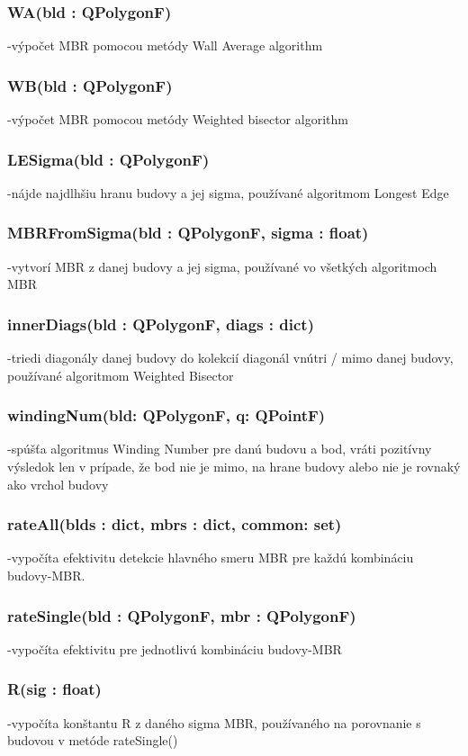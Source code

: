 \documentclass[12pt]{article}
\begin{document}
\subsubsection*{WA(bld : QPolygonF)}
\noindent-výpočet MBR pomocou metódy Wall Average algorithm
\subsubsection*{WB(bld : QPolygonF)}
\noindent-výpočet MBR pomocou metódy Weighted bisector algorithm
\subsubsection*{LE\textunderscore Sigma(bld : QPolygonF)}
\noindent-nájde najdlhšiu hranu budovy a jej sigma, používané algoritmom Longest Edge
\subsubsection*{MBR\textunderscore FromSigma(bld : QPolygonF, sigma : float)}
\noindent-vytvorí MBR z danej budovy a jej sigma, používané vo všetkých algoritmoch MBR
\subsubsection*{innerDiags(bld : QPolygonF, diags : dict)}
\noindent-triedi diagonály danej budovy do kolekcií diagonál vnútri / mimo danej budovy, používané algoritmom Weighted Bisector
\subsubsection*{windingNum(bld: QPolygonF, q: QPointF)}
\noindent-spúšťa algoritmus Winding Number pre danú budovu a bod, vráti pozitívny výsledok len v prípade, že bod nie je mimo, na hrane budovy alebo nie je rovnaký ako vrchol budovy
\subsubsection*{rateAll(blds : dict, mbrs : dict, common\textunderscorek : set)}
\noindent-vypočíta efektivitu detekcie hlavného smeru MBR pre každú kombináciu budovy-MBR.
\subsubsection*{rateSingle(bld : QPolygonF, mbr : QPolygonF)}
\noindent-vypočíta efektivitu pre jednotlivú kombináciu budovy-MBR
\subsubsection*{R(sig : float)}
\noindent-vypočíta konštantu R z daného sigma MBR, používaného na porovnanie s budovou v metóde rateSingle()
\end{document}
